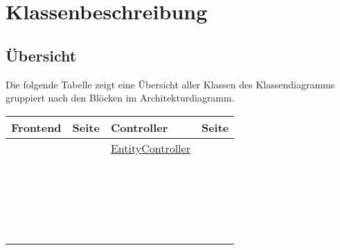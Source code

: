 \section{Klassenbeschreibung}
\subsection{Übersicht}
Die folgende Tabelle zeigt eine Übersicht aller Klassen des Klassendiagramms gruppiert nach den Blöcken im Architekturdiagramm.

\begin{table}[htbp]
\begin{tabular}{p{5cm} c | p{5cm} c}
Frontend & Seite & Controller & Seite\\
\hline
\nameref{MainWindow} & \pageref{MainWindow} & \hyperref[entCon]{EntityController} & \pageref{entCon}\\
\nameref{DatastreamWindow} & \pageref{DatastreamWindow} & \nameref{thingCon} & \pageref{thingCon}\\
\nameref{ThingWindow} & \pageref{ThingWindow} & \nameref{dataCon} & \pageref{dataCon}\\
\nameref{SensorWindow} & \pageref{SensorWindow} & \nameref{locCon} & \pageref{locCon}\\
\nameref{LocationWindow} & \pageref{LocationWindow} & \nameref{sensCon} & \pageref{sensCon}\\
\nameref{MagicWindow} & \pageref{MagicWindow} & \nameref{ObsPCon} & \pageref{ObsPCon}\\
\nameref{PropertyWindow} & \pageref{PropertyWindow} & \nameref{ConCon} & \pageref{ConCon}\\
\  &\  & \nameref{ImpCon} & \pageref{ImpCon}\\
\  &\  & \nameref{srcCon} & \pageref{srcCon}\\
\  &\  & \nameref{htmlCon} & \pageref{htmlCon}

\end{tabular}
\end{table}

